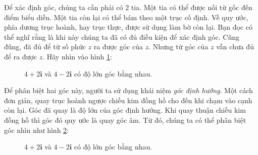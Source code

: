 \documentclass[a4paper, titlepage, openany]{book}
\begin{document}
Để xác định góc, chúng ta cần phải có $2$ tia. Một tia có thể được nối từ gốc đến điểm biểu diễn. Một tia còn lại có thể bám theo một trục cố định. Về quy ước, phía dương trục hoành, hay trục thực, được sử dụng làm bờ còn lại. Bạn đọc có thể nghĩ rằng là khi này chúng ta đã có đủ điều kiện để xác định góc. Cũng đũng, đã đủ để từ số phức $z$ ra được góc của $z$. Nhưng từ góc của $z$ vẫn chưa đủ để ra được $z$. Hãy nhìn vào hình \ref{fig:hai_truong_hop_goc}:
\begin{figure}[h]
   \centering
   \caption{$4+2\mathbf{i}$ và $4-2\mathbf{i}$ có độ lớn góc bằng nhau.}
   \label{fig:hai_truong_hop_goc}
\end{figure}


Để phân biệt hai góc này, người ta sử dụng khái niệm \emph{góc định hướng}. Một cách đơn giản, quay trục hoành ngược chiều kim đồng hồ cho đến khi chạm vào cạnh còn lại. Góc đã quay là độ lớn của góc định hướng. Khi quay thuận chiều kim đồng hồ thì góc đó quy ước là quay góc âm. Từ đó, chúng ta có thể phân biệt góc nhìn như hình \ref{fig:hai_truong_hop_goc_dinh_huong}:

\begin{figure}[h]
   \centering
   \caption{$4+2\mathbf{i}$ và $4-2\mathbf{i}$ có độ lớn góc bằng nhau.}
   \label{fig:hai_truong_hop_goc_dinh_huong}
\end{figure}
\end{document}
